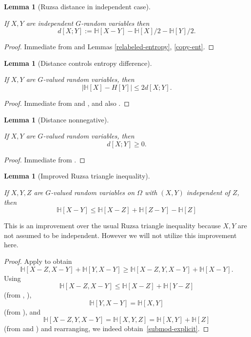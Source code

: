 \documentclass[10pt,a4paper]{article}
\newtheorem{lemma}[theorem]{Lemma}
\newcommand{\lean}[1]{}
\newcommand{\uses}[1]{}
\newcommand{\leanok}{}
\newcommand{\bbH}{\mathbb{H}}
\begin{document}
\begin{lemma}[Ruzsa distance in independent case]\label{ruz-indep}
  \uses{ruz-dist-def}
  \lean{ProbabilityTheory.IndepFun.rdist_eq}\leanok
  If $X,Y$ are independent $G$-random variables then
  $$ d[X ;Y] := \bbH[X - Y] - \bbH[X]/2 - \bbH[Y]/2.$$
\end{lemma}

\begin{proof} \uses{relabeled-entropy, copy-ent}\leanok Immediate from  and Lemmas \ref{relabeled-entropy}, \ref{copy-ent}.
\end{proof}


\begin{lemma}[Distance controls entropy difference]\label{ruzsa-diff}
  \uses{ruz-dist-def}
  \lean{diff_ent_le_rdist}\leanok
  If $X,Y$ are $G$-valued random variables, then
$$|\bbH[X]-H[Y]| \leq 2 d[X ;Y].$$
\end{lemma}

\begin{proof} \uses{sumset-lower, neg-ent} \leanok Immediate from  and , and also .
\end{proof}


\begin{lemma}[Distance nonnegative]\label{ruzsa-nonneg}
  \lean{rdist_nonneg}\leanok
  If $X,Y$ are $G$-valued random variables, then
  $$ d[X ;Y] \geq 0.$$
\end{lemma}

\begin{proof}
  \uses{ruzsa-diff}
  \leanok
  Immediate from .
\end{proof}


\begin{lemma}[Improved Ruzsa triangle inequality]
  \label{ruzsa-triangle-improved}
  \lean{ent_of_diff_le}
  \leanok
  If $X,Y,Z$ are $G$-valued random variables on $\Omega$ with $(X,Y)$ independent of $Z$, then
  \begin{equation}\label{submod-explicit} \bbH[X - Y] \leq \bbH[X-Z] + \bbH[Z-Y] - \bbH[Z]\end{equation}
\end{lemma}

This is an improvement over the usual Ruzsa triangle inequality because $X,Y$ are not assumed to be independent.  However we will not utilize this improvement here.

\begin{proof}
  \uses{alt-submodularity,subadditive, relabeled-entropy, add-entropy}
  \leanok
  Apply  to obtain
  \[\bbH[X - Z, X - Y] + \bbH[Y, X - Y] \geq \bbH[X - Z, Y, X - Y] + \bbH[X - Y].\]
  Using
  \[\bbH[X - Z, X - Y] \leq \bbH[X - Z] + \bbH[Y - Z]\]
  (from , ),
  \[\bbH[Y, X - Y] = \bbH[X, Y] \]
  (from ), and
  \[\bbH[X - Z, Y, X - Y] = \bbH[X, Y, Z] = \bbH[X, Y] + \bbH[Z]\]
  (from  and ) and rearranging, we indeed obtain~\eqref{submod-explicit}.
\end{proof}
\end{document}
